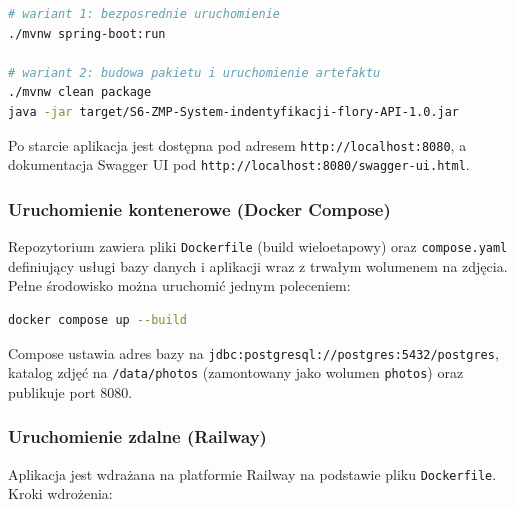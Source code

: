 \documentclass[12pt,a4paper]{article}
\begin{document}
\begin{lstlisting}[language=bash, caption=Uruchomienie w trybie deweloperskim]
# wariant 1: bezposrednie uruchomienie
./mvnw spring-boot:run

# wariant 2: budowa pakietu i uruchomienie artefaktu
./mvnw clean package
java -jar target/S6-ZMP-System-indentyfikacji-flory-API-1.0.jar
\end{lstlisting}

Po starcie aplikacja jest dost\k{e}pna pod adresem \texttt{http://localhost:8080}, a dokumentacja Swagger UI pod \texttt{http://localhost:8080/swagger-ui.html}.

\subsubsection{Uruchomienie kontenerowe (Docker Compose)}

Repozytorium zawiera pliki \texttt{Dockerfile} (build wieloetapowy) oraz \texttt{compose.yaml} definiuj\k{a}cy us\l{}ugi bazy danych i aplikacji wraz z trwa\l{}ym wolumenem na zdj\k{e}cia. Pe\l{}ne \'srodowisko mo\.zna uruchomi\'c jednym poleceniem:

\begin{lstlisting}[language=bash, caption=Uruchomienie przez Docker Compose]
docker compose up --build
\end{lstlisting}

Compose ustawia adres bazy na \texttt{jdbc:postgresql://postgres:5432/postgres}, katalog zdj\k{e}\'c na \texttt{/data/\allowbreak{}photos} (zamontowany jako wolumen \texttt{photos}) oraz publikuje port 8080.

\subsubsection{Uruchomienie zdalne (Railway)}

Aplikacja jest wdra\.zana na platformie Railway na podstawie pliku \texttt{Dockerfile}. Kroki wdro\.zenia:
\end{document}
